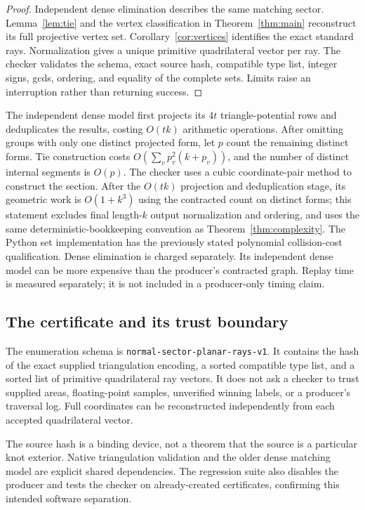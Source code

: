 \documentclass[11pt,letterpaper]{article}
\theoremstyle{definition}
\theoremstyle{remark}\newtheorem{remark}[theorem]{Remark}
\newcommand{\code}[1]{\nolinkurl{#1}}
\begin{document}
\begin{proof}
Independent dense elimination describes the same matching sector.
Lemma~\ref{lem:tie} and the vertex classification in
Theorem~\ref{thm:main} reconstruct its full projective vertex set.
Corollary~\ref{cor:vertices} identifies the exact standard rays.
Normalization gives a unique primitive quadrilateral vector per ray.
The checker validates the schema, exact source hash, compatible type
list, integer signs, gcds, ordering, and equality of the complete sets.
Limits raise an interruption rather than returning success.
\end{proof}

The independent dense model first projects its $4t$ triangle-potential
rows and deduplicates the results, costing $O(tk)$ arithmetic operations.
After omitting groups with only one distinct projected form, let $p$
count the remaining distinct forms. Tie construction
costs $O(\sum_v p_v^2(k+p_v))$, and the number of distinct internal
segments is $O(p)$. The checker uses a cubic coordinate-pair method to construct the section.
After the $O(tk)$ projection and deduplication stage, its geometric work
is $O(1+k^3)$ using the contracted count on distinct forms; this statement
excludes final length-$k$ output normalization and ordering, and uses the
same deterministic-bookkeeping convention as Theorem~\ref{thm:complexity}.
The Python set implementation has the previously stated polynomial
collision-cost qualification. Dense elimination is charged separately. Its independent dense model can be
more expensive than the producer's contracted graph. Replay time is measured separately; it is not included
in a producer-only timing claim.

\subsection{The certificate and its trust boundary}

The enumeration schema is \code{normal-sector-planar-rays-v1}. It contains
the hash of the exact supplied triangulation encoding, a sorted compatible
type list, and a sorted list of primitive quadrilateral ray vectors.
It does not ask a checker to trust supplied areas, floating-point samples,
unverified winning labels, or a producer's traversal log. Full coordinates
can be reconstructed independently from each accepted quadrilateral vector.

The source hash is a binding device, not a theorem that the source is a
particular knot exterior. Native triangulation validation and the older
dense matching model are explicit shared dependencies. The regression
suite also disables the producer and tests the checker on already-created
certificates, confirming this intended software separation.
\end{document}
